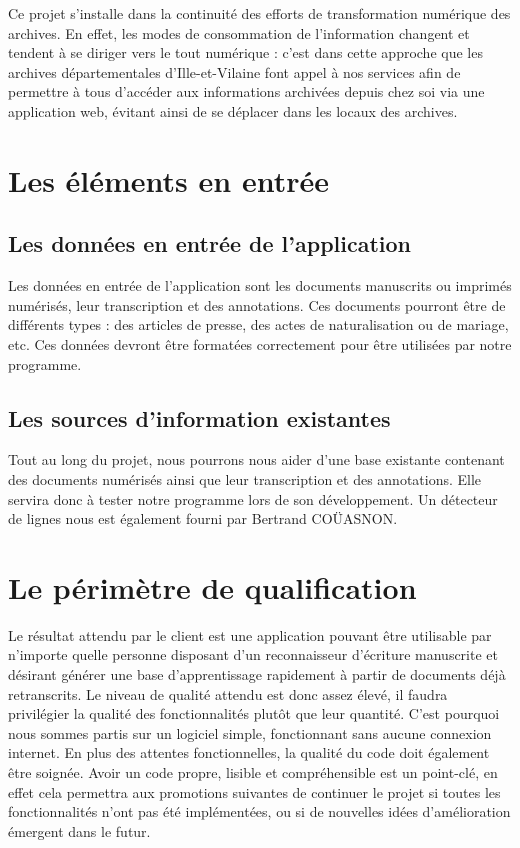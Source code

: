 Ce projet s’installe dans la continuité des efforts de transformation numérique des archives. En effet, les modes de consommation de l’information changent et tendent à se diriger vers le tout numérique : c’est dans cette approche que les archives départementales d’Ille-et-Vilaine font appel à nos services afin de permettre à tous d’accéder aux informations archivées depuis chez soi via une application web, évitant ainsi de se déplacer dans les locaux des archives.

\section{Les éléments en entrée}

\subsection{Les données en entrée de l'application}

Les données en entrée de l’application sont les documents manuscrits ou imprimés numérisés, leur transcription et des annotations. Ces documents pourront être de différents types : des articles de presse, des actes de naturalisation ou de mariage, etc. Ces données devront être formatées correctement pour être utilisées par notre programme.

\newpage

\subsection{Les sources d'information existantes}

Tout au long du projet, nous pourrons nous aider d’une base existante contenant des documents numérisés ainsi que leur transcription et des annotations. Elle servira donc à tester notre programme lors de son développement. Un détecteur de lignes nous est également fourni par Bertrand COÜASNON.

\section{Le périmètre de qualification}

Le résultat attendu par le client est une application pouvant être utilisable par n’importe quelle personne disposant d’un reconnaisseur d’écriture manuscrite et désirant générer une base d’apprentissage rapidement à partir de documents déjà retranscrits. Le niveau de qualité attendu est donc assez élevé, il faudra privilégier la qualité des fonctionnalités plutôt que leur quantité. C’est pourquoi nous sommes partis sur un logiciel simple, fonctionnant sans aucune connexion internet. En plus des attentes fonctionnelles, la qualité du code doit également être soignée. Avoir un code propre, lisible et compréhensible est un point-clé, en effet cela permettra aux promotions suivantes de continuer le projet si toutes les fonctionnalités n’ont pas été implémentées, ou si de nouvelles idées d’amélioration émergent dans le futur.

